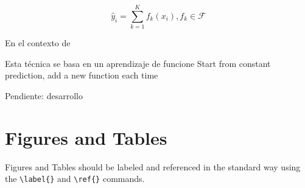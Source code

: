\documentclass[9pt,twocolumn,twoside]{ilcss}
\begin{document}
\begin{equation}
\hat{y}_i = \sum_{k=1}^K f_k(x_i), f_k \in \mathcal{F}
\end{equation}



En el contexto de 

Esta técnica se basa en un aprendizaje de funcione
Start from constant prediction, add a new function each time


Pendiente: desarrollo

\section{Figures and Tables}

Figures and Tables should be labeled and referenced in the standard way using the \verb|\label{}| and \verb|\ref{}| commands.




\end{document}

